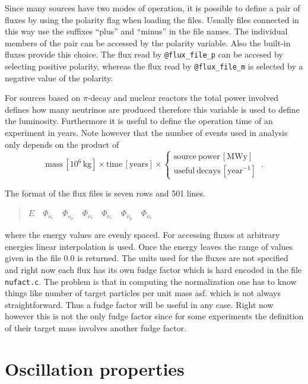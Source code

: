 Since many sources have two modes of operation, it is possible to define
a pair of fluxes by using the polarity flag when loading the files. Usually
files connected in this way use the suffixes ``plus'' and ``minus'' in the 
file names. The individual members of the pair can be accessed by the polarity
variable. Also the built-in fluxes provide this choice.
The flux read by {\tt @flux\_file\_p} can be accesed by selecting positive
polarity, whereas the flux read by {\tt @flux\_file\_m} is selected by a 
negative value of the polarity.



For sources based on $\pi$-decay and nuclear reactors the total power
involved defines how many neutrinos are produced therefore this variable is
used to define the luminosity. Furthermore it is useful to define 
the operation time of an experiment in years. Note however that the 
number of events used in analysis only depends on the product of
\begin{equation}
\mathrm{mass}\,\left[10^6\,\mathrm{kg}\right]\times \mathrm{time}
\,\left[\mathrm{years}\right]\times\left\{ \begin{array}{c}
\mathrm{source~power}\,\left[\mathrm{MWy}\right]\\
\mathrm{useful~decays}\,\left[\mathrm{year}^{-1}\right]
\end{array}\right.\,.
\end{equation}

The format of the flux files is seven rows and
501 lines.
\begin{quotation}
$ E\quad
\Phi_{\nu_e}\quad
\Phi_{\nu_\mu}\quad
\Phi_{\nu_\tau}\quad
\Phi_{\bar\nu_e}\quad
\Phi_{\bar\nu_\mu}\quad
\Phi_{\bar\nu_\tau}$
\end{quotation}
where the energy values are evenly spaced. 
For accessing fluxes at 
arbitrary energies linear interpolation is used. Once the energy leaves the
range of values given in the file $0.0$ is returned. The units used for the
fluxes are not specified and right now each flux has its own fudge factor
which is hard encoded in the file {\tt nufact.c}. The problem is that
in computing the normalization one has to know things like number of target
particles per unit mass asf. which is not always straightforward. Thus a fudge
factor will be useful in any case. Right now however this is not the only 
fudge factor since for some experiments the definition of their target mass
involves another fudge factor. 
\section{Oscillation properties}



